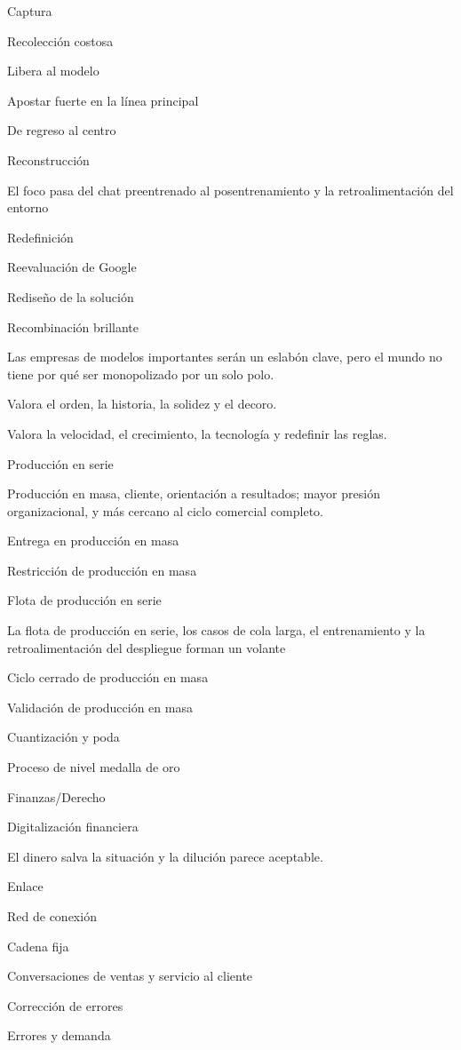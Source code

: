 \documentclass{article}
\begin{document}
Captura

Recolección costosa

Libera al modelo

Apostar fuerte en la línea principal

De regreso al centro

Reconstrucción

El foco pasa del chat preentrenado al posentrenamiento y la retroalimentación del entorno

Redefinición

Reevaluación de Google

Rediseño de la solución

Recombinación brillante

Las empresas de modelos importantes serán un eslabón clave, pero el mundo no tiene por qué ser monopolizado por un solo polo.

Valora el orden, la historia, la solidez y el decoro.

Valora la velocidad, el crecimiento, la tecnología y redefinir las reglas.

Producción en serie

Producción en masa, cliente, orientación a resultados; mayor presión organizacional, y más cercano al ciclo comercial completo.

Entrega en producción en masa

Restricción de producción en masa

Flota de producción en serie

La flota de producción en serie, los casos de cola larga, el entrenamiento y la retroalimentación del despliegue forman un volante

Ciclo cerrado de producción en masa

Validación de producción en masa

Cuantización y poda

Proceso de nivel medalla de oro

Finanzas/Derecho

Digitalización financiera

El dinero salva la situación y la dilución parece aceptable.

Enlace

Red de conexión

Cadena fija

Conversaciones de ventas y servicio al cliente

Corrección de errores

Errores y demanda
\end{document}
